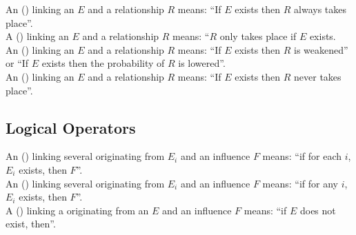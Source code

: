 \noindent
An  () linking an  $E$ and a relationship $R$ means: ``If $E$ exists then $R$ always takes place''. 
\\[\baselineskip]

\noindent
A  () linking an  $E$ and a relationship $R$ means: ``$R$ only takes place if $E$ exists. 
\\[\baselineskip]

\noindent
An  () linking an  $E$ and a relationship $R$ means: ``If $E$ exists then $R$ is weakened'' or ``If $E$ exists then the probability of $R$ is lowered''. 
\\[\baselineskip]

\noindent
An  () linking an  $E$ and a relationship $R$ means: ``If $E$ exists then $R$ never takes place''. 
\\[\baselineskip]

\subsection{Logical Operators}

An  () linking several  originating from  $E_i$ and an influence $F$ means: ``if for each $i$, $E_i$ exists, then $F$''.\\[\baselineskip]

\noindent
An  () linking several  originating from  $E_i$ and an influence $F$ means: ``if for any $i$, $E_i$ exists, then $F$''.\\[\baselineskip]

\noindent
A  () linking a  originating from an  $E$ and an influence $F$ means: ``if $E$ does not exist, then''.\\[\baselineskip]

